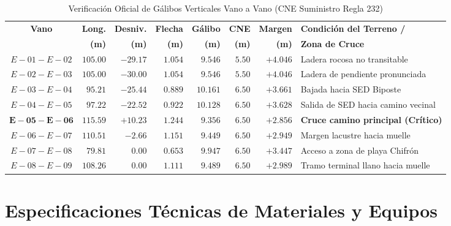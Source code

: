 \documentclass[12pt,a4paper]{report}
\begin{document}
\begin{table}[H]
\centering
\caption{Verificación Oficial de Gálibos Verticales Vano a Vano (CNE Suministro Regla 232)}
\label{tab:galibos_vanos}
\small
\setlength{\tabcolsep}{4.0pt}
\renewcommand{\arraystretch}{1.20}
\begin{tabularx}{\linewidth}{c r r r r r r L}
\toprule
\textbf{Vano} & \textbf{Long.} & \textbf{Desniv.} & \textbf{Flecha} & \textbf{Gálibo} & \textbf{CNE} & \textbf{Margen} & \textbf{Condición del Terreno /} \\
              & \textbf{(m)}   & \textbf{(m)}     & \textbf{(m)}    & \textbf{(m)}    & \textbf{(m)} & \textbf{(m)}    & \textbf{Zona de Cruce} \\
\midrule
$E-01 - E-02$ & $105.00$ & $-29.17$ & $1.054$ & $9.546$ & $5.50$ & $+4.046$ & Ladera rocosa no transitable \\
$E-02 - E-03$ & $105.00$ & $-30.00$ & $1.054$ & $9.546$ & $5.50$ & $+4.046$ & Ladera de pendiente pronunciada \\
$E-03 - E-04$ & $95.21$  & $-25.44$ & $0.889$ & $10.161$ & $6.50$ & $+3.661$ & Bajada hacia SED Biposte \\
$E-04 - E-05$ & $97.22$  & $-22.52$ & $0.922$ & $10.128$ & $6.50$ & $+3.628$ & Salida de SED hacia camino vecinal \\
$\mathbf{E-05 - E-06}$ & $\mathbf{115.59}$ & $\mathbf{+10.23}$ & $\mathbf{1.244}$ & $\mathbf{9.356}$ & $\mathbf{6.50}$ & $\mathbf{+2.856}$ & \textbf{Cruce camino principal (Crítico)} \\
$E-06 - E-07$ & $110.51$ & $-2.66$  & $1.151$ & $9.449$ & $6.50$ & $+2.949$ & Margen lacustre hacia muelle \\
$E-07 - E-08$ & $79.81$  & $0.00$   & $0.653$ & $9.947$ & $6.50$ & $+3.447$ & Acceso a zona de playa Chifrón \\
$E-08 - E-09$ & $108.26$ & $0.00$   & $1.111$ & $9.489$ & $6.50$ & $+2.989$ & Tramo terminal llano hacia muelle \\
\bottomrule
\end{tabularx}
\end{table}

\chapter{Especificaciones Técnicas de Materiales y Equipos}
\end{document}
